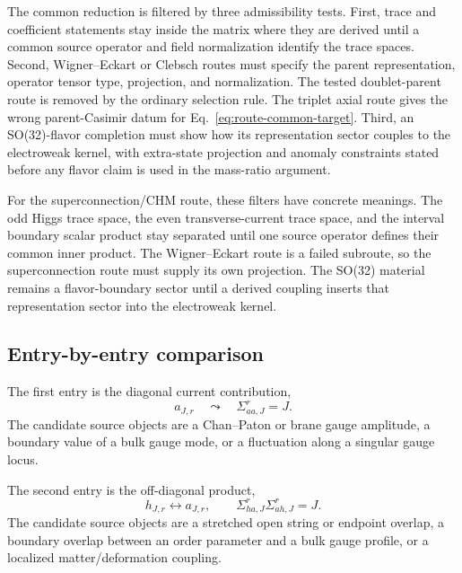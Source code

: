 The common reduction is filtered by three admissibility tests.  First, trace
and coefficient statements stay inside the matrix where they are derived until
a common source operator and field normalization identify the trace spaces.
Second, Wigner--Eckart or Clebsch routes must specify the parent
representation, operator tensor type, projection, and normalization.  The
tested doublet-parent route is removed by the ordinary selection rule.  The
triplet axial route gives the wrong parent-Casimir datum for
Eq.~\eqref{eq:route-common-target}.  Third, an SO(32)-flavor completion must
show how its representation sector couples to the electroweak kernel, with
extra-state projection and anomaly constraints stated before any flavor claim
is used in the mass-ratio argument.

For the superconnection/CHM route, these filters have concrete meanings.  The
odd Higgs trace space, the even transverse-current trace space, and the
interval boundary scalar product stay separated until one source operator
defines their common inner product.  The Wigner--Eckart route is a failed
subroute, so the superconnection route must supply its own projection.  The
SO(32) material remains a flavor-boundary sector until a
derived coupling inserts that representation sector into the electroweak kernel.

\subsection{Entry-by-entry comparison}
\label{sec:entry-comparison}

The first entry is the diagonal current contribution,
\begin{equation}
  a_{J,r}
  \quad\leadsto\quad
  \Sigma_{aa,J}^{r}=J.
  \label{eq:route-current-question}
\end{equation}
The candidate source objects are a Chan--Paton or brane gauge amplitude, a
boundary value of a bulk gauge mode, or a fluctuation along a singular gauge
locus.

The second entry is the off-diagonal product,
\begin{equation}
  h_{J,r}
  \leftrightarrow
  a_{J,r},
  \qquad
  \Sigma_{ha,J}^{r}\Sigma_{ah,J}^{r}=J.
  \label{eq:route-mixing-question}
\end{equation}
The candidate source objects are a stretched open string or endpoint overlap,
a boundary overlap between an order parameter and a bulk gauge profile, or a
localized matter/deformation coupling.

